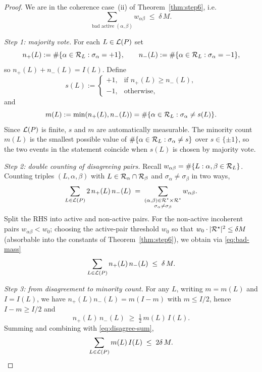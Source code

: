 \begin{proof}
We are in the coherence case~(ii) of Theorem~\ref{thm:step6}, i.e.
\begin{equation}\label{eq:bad-mass}
  \sum_{\text{bad active }(\alpha,\beta)} w_{\alpha\beta}
  \;\le\;\delta\,M.
\end{equation}

\smallskip\noindent\emph{Step 1: majority vote.}
For each $L\in\mathcal{L}(P)$ set
\[
  n_+(L):=\#\{\alpha\in\mathcal{R}_L:\sigma_\alpha=+1\},\qquad
  n_-(L):=\#\{\alpha\in\mathcal{R}_L:\sigma_\alpha=-1\},
\]
so $n_+(L)+n_-(L)=I(L)$.  Define
\[
  s(L):=
  \begin{cases}
    +1,&\text{if }n_+(L)\ge n_-(L),\\
    -1,&\text{otherwise,}
  \end{cases}
\]
and
\[
  m(L):=\min(n_+(L),n_-(L))
      =\#\{\alpha\in\mathcal{R}_L:\sigma_\alpha\ne s(L)\}.
\]
Since $\mathcal{L}(P)$ is finite, $s$ and $m$ are automatically measurable.
The minority count $m(L)$ is the smallest possible value of
$\#\{\alpha\in\mathcal{R}_L:\sigma_\alpha\ne s\}$ over $s\in\{\pm1\}$, so the
two events in the statement coincide when $s(L)$ is chosen by majority
vote.

\smallskip\noindent\emph{Step 2: double counting of disagreeing pairs.}
Recall $w_{\alpha\beta}=\#\{L:\alpha,\beta\in\mathcal{R}_L\}$.
Counting triples $(L,\alpha,\beta)$ with $L\in\mathcal{R}_\alpha\cap\mathcal{R}_\beta$
and $\sigma_\alpha\ne\sigma_\beta$ in two ways,
\[
  \sum_{L\in\mathcal{L}(P)} 2\,n_+(L)\,n_-(L)
   \;=\;
  \sum_{\substack{(\alpha,\beta)\in\mathcal{R}^\star\times\mathcal{R}^\star\\
        \sigma_\alpha\ne\sigma_\beta}} w_{\alpha\beta}.
\]
Split the RHS into active and non-active pairs.  For the non-active
incoherent pairs $w_{\alpha\beta}<w_0$; choosing the active-pair
threshold $w_0$ so that
$w_0\cdot|\mathcal{R}^\star|^2\le\delta M$ (absorbable into the constants of
Theorem~\ref{thm:step6}), we obtain via \eqref{eq:bad-mass}
\begin{equation}\label{eq:disagree-sum}
  \sum_{L\in\mathcal{L}(P)} n_+(L)\,n_-(L)
  \;\le\;\delta\,M.
\end{equation}

\smallskip\noindent\emph{Step 3: from disagreement to minority count.}
For any $L$, writing $m=m(L)$ and $I=I(L)$, we have
$n_+(L)n_-(L)=m(I-m)$ with $m\le I/2$, hence $I-m\ge I/2$ and
\[
  n_+(L)\,n_-(L)\;\ge\;\tfrac12\,m(L)\,I(L).
\]
Summing and combining with \eqref{eq:disagree-sum},
\begin{equation}\label{eq:mI-sum}
  \sum_{L\in\mathcal{L}(P)} m(L)\,I(L)
  \;\le\;2\delta\,M.
\end{equation}


\end{proof}

